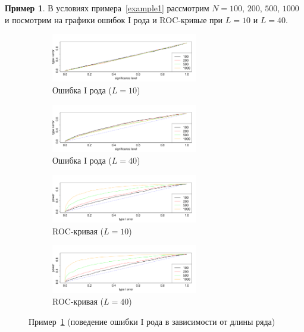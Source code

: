 \documentclass[specialist,
substylefile = spbu_report.rtx,
subf,href,colorlinks=true, 12pt]{disser}
\theoremstyle{definition}
\newtheorem{example}{Пример}
\begin{document}
\begin{example}\label{example5}
	В условиях примера~\ref{example1} рассмотрим $N=100$, $200$, $500$, $1000$ и посмотрим на графики ошибок I рода и ROC-кривые при $L=10$ и $L=40$.
	\begin{figure}[h!]
		\captionsetup[subfigure]{justification=Centering}
		\begin{subfigure}[t]{\textwidth}
			\centering
			\includegraphics[width=0.7\textwidth]{img/alphaI_L10.pdf}
			\caption{Ошибка I рода ($L=10$)}
			\label{alphaI_L10}
		\end{subfigure}
		\begin{subfigure}[t]{\textwidth}
			\centering
			\includegraphics[width=0.7\textwidth]{img/alphaI_L40.pdf}
			\caption{Ошибка I рода ($L=40$)}
			\label{alphaI_L40}
		\end{subfigure}
		\begin{subfigure}[t]{\textwidth}
			\centering
			\includegraphics[width=0.7\textwidth]{img/roc_L10.pdf}
			\caption{ROC-кривая ($L=10$)}
			\label{roc_L10}
		\end{subfigure}
		\begin{subfigure}[t]{\textwidth}
			\centering
			\includegraphics[width=0.7\textwidth]{img/roc_L40.pdf}
			\caption{ROC-кривая ($L=40$)}
			\label{roc_L40}
		\end{subfigure}
	\label{fig:example5}
	\caption{Пример~\ref{example5} (поведение ошибки I рода в зависимости от длины ряда)}
	\end{figure}


\end{example}
\end{document}
